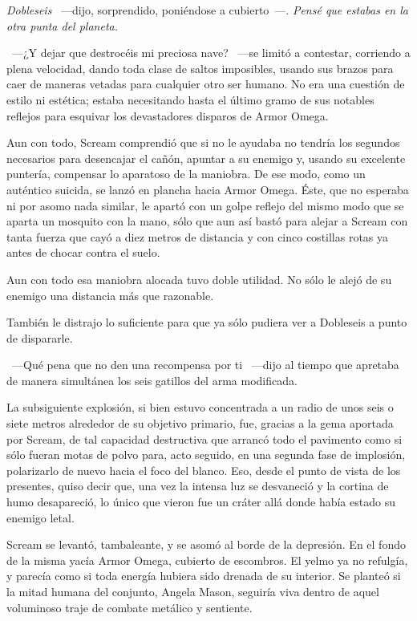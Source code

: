 \emph{Dobleseis} ~---dijo, sorprendido, poniéndose a cubierto~---. \emph{Pensé que estabas en la otra punta del planeta.}

~---¿Y dejar que destrocéis mi preciosa nave? ~---se limitó a contestar, corriendo a plena velocidad, dando toda clase de saltos imposibles, usando sus brazos para caer de maneras vetadas para cualquier otro ser humano. No era una cuestión de estilo ni estética; estaba necesitando hasta el último gramo de sus notables reflejos para esquivar los devastadores disparos de Armor Omega.

Aun con todo, Scream comprendió que si no le ayudaba no tendría los segundos necesarios para desencajar el cañón, apuntar a su enemigo y, usando su excelente puntería, compensar lo aparatoso de la maniobra. De ese modo, como un auténtico suicida, se lanzó en plancha hacia Armor Omega. Éste, que no esperaba ni por asomo nada similar, le apartó con un golpe reflejo del mismo modo que se aparta un mosquito con la mano, sólo que aun así bastó para alejar a Scream con tanta fuerza que cayó a diez metros de distancia y con cinco costillas rotas ya antes de chocar contra el suelo.

Aun con todo esa maniobra alocada tuvo doble utilidad. No sólo le alejó de su enemigo una distancia más que razonable.

También le distrajo lo suficiente para que ya sólo pudiera ver a Dobleseis a punto de dispararle.

~---Qué pena que no den una recompensa por ti ~---dijo al tiempo que apretaba de manera simultánea los seis gatillos del arma modificada.

La subsiguiente explosión, si bien estuvo concentrada a un radio de unos seis o siete metros alrededor de su objetivo primario, fue, gracias a la gema aportada por Scream, de tal capacidad destructiva que arrancó todo el pavimento como si sólo fueran motas de polvo para, acto seguido, en una segunda fase de implosión, polarizarlo de nuevo hacia el foco del blanco. Eso, desde el punto de vista de los presentes, quiso decir que, una vez la intensa luz se desvaneció y la cortina de humo desapareció, lo único que vieron fue un cráter allá donde había estado su enemigo letal.

Scream se levantó, tambaleante, y se asomó al borde de la depresión. En el fondo de la misma yacía Armor Omega, cubierto de escombros. El yelmo ya no refulgía, y parecía como si toda energía hubiera sido drenada de su interior. Se planteó si la mitad humana del conjunto, Angela Mason, seguiría viva dentro de aquel voluminoso traje de combate metálico y sentiente.

